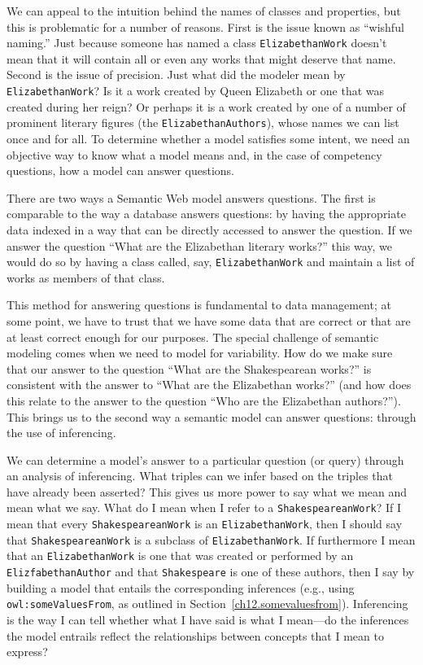 We can appeal to the intuition behind the names of classes and
properties, but this is problematic for a number of reasons. First is
the issue known as ``wishful naming.'' Just because someone has named a
class \texttt{ElizabethanWork} doesn't mean that it will contain all or even any
works that might deserve that name. Second is the issue of precision.
Just what did the modeler mean by \texttt{ElizabethanWork}? Is it a work created
by Queen Elizabeth or one that was created during her reign? Or perhaps
it is a work created by one of a number of prominent literary figures
(the \texttt{ElizabethanAuthors}), whose names we can list once and for all. To
determine whether a model satisfies some intent, we need an objective
way to know what a model means and, in the case of competency questions,
how a model can answer questions.

There are two ways a Semantic Web model answers questions. The first is
comparable to the way a database answers questions: by having the
appropriate data indexed in a way that can be directly accessed to
answer the question. If we answer the question ``What are the
Elizabethan literary works?'' this way, we would do so by having a class
called, say, \texttt{ElizabethanWork} and maintain a list of works as members of
that class.

This method for answering questions is fundamental to data management;
at some point, we have to trust that we have some data that are correct
or that are at least correct enough for our purposes. The special
challenge of semantic modeling comes when we need to model for
variability. How do we make sure that our answer to the question ``What
are the Shakespearean works?'' is consistent with the answer to ``What
are the Elizabethan works?'' (and how does this relate to the answer to
the question ``Who are the Elizabethan authors?''). This brings us to
the second way a semantic model can answer questions: through the use of
inferencing.

We can determine a model's answer to a particular question (or query)
through an analysis of inferencing. What triples can we infer based on
the triples that have already been asserted? This gives us more power to
say what we mean and mean what we say. What do I mean when I refer to a
\texttt{ShakespeareanWork}? If I mean that every \texttt{ShakespeareanWork} is an
\texttt{ElizabethanWork}, then I should say that \texttt{ShakespeareanWork} is a subclass
of \texttt{ElizabethanWork}. If furthermore I mean that an \texttt{ElizabethanWork} is one
that was created or performed by an \texttt{ElizfabethanAuthor} and that
\texttt{Shakespeare} is one of these authors, then I say by building a model that
entails the corresponding inferences (e.g., using \texttt{owl:someValuesFrom}, as 
outlined in Section~\ref{ch12.somevaluesfrom}).
Inferencing is the way I can tell whether what I have said is what I
mean---do the inferences the model entrails reflect the relationships
between concepts that I mean to express?

